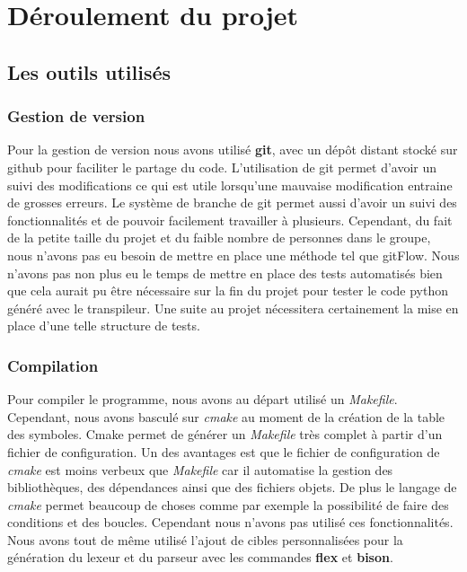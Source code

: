 \documentclass[a4paper]{article}%
\begin{document}
\section{Déroulement du projet}

\subsection{Les outils utilisés}

\subsubsection{Gestion de version}

Pour la gestion de version nous avons utilisé \textbf{git}, avec un dépôt
distant stocké sur github pour faciliter le partage du code. L'utilisation de
git permet d'avoir un suivi des modifications ce qui est utile lorsqu'une
mauvaise modification entraine de grosses erreurs. Le système de branche de git
permet aussi d'avoir un suivi des fonctionnalités et de pouvoir facilement
travailler à plusieurs. Cependant, du fait de la petite taille du projet et du
faible nombre de personnes dans le groupe, nous n'avons pas eu besoin de mettre
en place une méthode tel que gitFlow. Nous n'avons pas non plus eu le temps de
mettre en place des tests automatisés bien que cela aurait pu être nécessaire
sur la fin du projet pour tester le code python généré avec le transpileur. Une
suite au projet nécessitera certainement la mise en place d'une telle structure
de tests.\\

\subsubsection{Compilation}

Pour compiler le programme, nous avons au départ utilisé un \textit{Makefile}.
Cependant, nous avons basculé sur \textit{cmake} au moment de la création de la
table des symboles. Cmake permet de générer un \textit{Makefile} très complet à
partir d'un fichier de configuration. Un des avantages est que le fichier de
configuration de \textit{cmake} est moins verbeux que \textit{Makefile} car il
automatise la gestion des bibliothèques, des dépendances ainsi que des fichiers
objets. De plus le langage de \textit{cmake} permet beaucoup de choses comme par
exemple la possibilité de faire des conditions et des boucles. Cependant nous
n'avons pas utilisé ces fonctionnalités. Nous avons tout de même utilisé l'ajout
de cibles personnalisées pour la génération du lexeur et du parseur avec les
commandes \textbf{flex} et \textbf{bison}.
\end{document}
